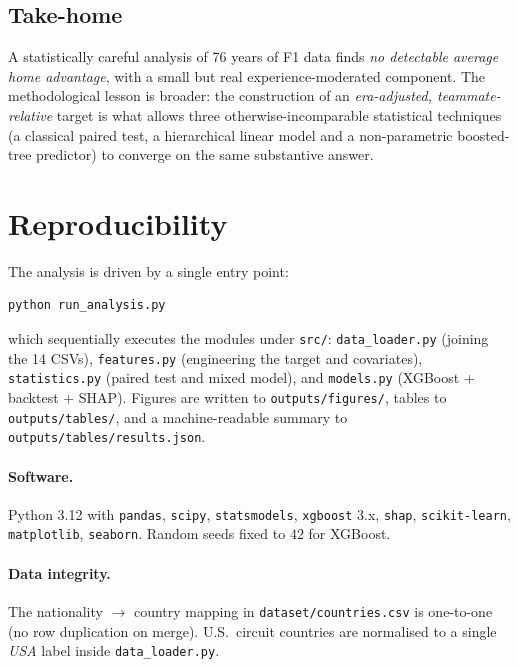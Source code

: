 \documentclass[11pt,a4paper]{article}
\newcommand{\code}[1]{\texttt{\small #1}}
\begin{document}
\subsection{Take-home}
A statistically careful analysis of 76 years of F1 data finds
\emph{no detectable average home advantage}, with a small but real
experience-moderated component. The methodological lesson is broader:
the construction of an \emph{era-adjusted, teammate-relative} target is
what allows three otherwise-incomparable statistical techniques (a
classical paired test, a hierarchical linear model and a non-parametric
boosted-tree predictor) to converge on the same substantive answer.

\appendix
\section{Reproducibility}

The analysis is driven by a single entry point:
\begin{verbatim}
python run_analysis.py
\end{verbatim}
which sequentially executes the modules under \code{src/}:
\code{data\_loader.py} (joining the 14 CSVs), \code{features.py} (engineering
the target and covariates), \code{statistics.py} (paired test and mixed
model), and \code{models.py} (XGBoost + backtest + SHAP). Figures are
written to \code{outputs/figures/}, tables to \code{outputs/tables/}, and a
machine-readable summary to \code{outputs/tables/results.json}.

\paragraph{Software.}
Python 3.12 with \code{pandas}, \code{scipy}, \code{statsmodels},
\code{xgboost} 3.x, \code{shap}, \code{scikit-learn}, \code{matplotlib},
\code{seaborn}. Random seeds fixed to $42$ for XGBoost.

\paragraph{Data integrity.}
The nationality $\to$ country mapping in \code{dataset/countries.csv} is
one-to-one (no row duplication on merge). U.S.\ circuit countries are
normalised to a single \textit{USA} label inside \code{data\_loader.py}.
\end{document}
